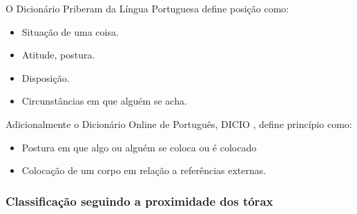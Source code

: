 
 
\begin{definition}[Posição:] 
\label{def:Posicao}O Dicionário Priberam da Língua Portuguesa \cite{priberamposicao} define posição como:
\begin{itemize}
\item Situação de uma coisa.
\item Atitude, postura.
\item Disposição.
\item Circunstâncias em que alguém se acha.
\end{itemize}
Adicionalmente o Dicionário Online de Português, DICIO \cite{dicioposicao}, define princípio como:
\begin{itemize}
\item Postura em que algo ou alguém se coloca ou é colocado
\item Colocação de um corpo em relação a referências externas.
\end{itemize}
\end{definition}


\subsubsection{Classificação seguindo a proximidade dos tórax}

